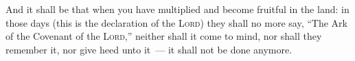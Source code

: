 
\begin{inparaenum}
  
  
   And it shall be that when you have multiplied and become fruitful in the land: in those days (this is the declaration of the \textsc{Lord}) they shall no more say, ``The Ark of the Covenant of the \textsc{Lord},'' neither shall it come to mind, nor shall they remember it, nor give heed unto it~--- it shall not be done anymore.%
  
\end{inparaenum}
